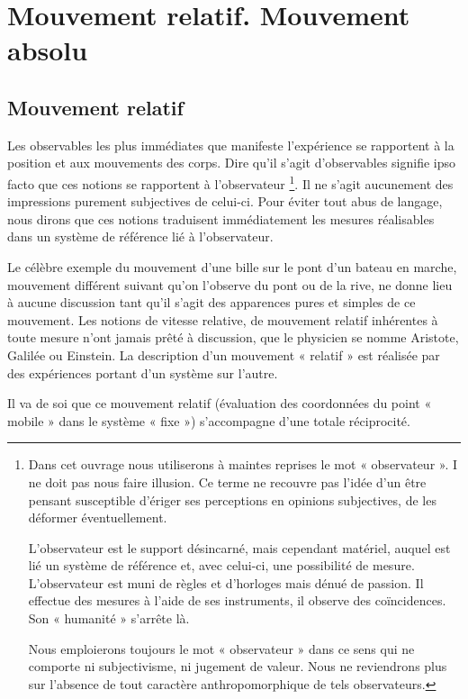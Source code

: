 \section{Mouvement relatif. Mouvement absolu}

\subsection{Mouvement relatif}
Les observables les plus immédiates que manifeste
l’expérience se rapportent à la position et aux mouvements des corps.
Dire qu’il s’agit d’observables signifie ipso facto que ces notions se
rapportent à l’observateur \footnote{Dans cet ouvrage nous utiliserons à maintes reprises le mot « observateur ».
I ne doit pas nous faire illusion. Ce terme ne recouvre pas l’idée d’un être pensant
susceptible d’ériger ses perceptions en opinions subjectives, de les déformer éventuellement.

L’observateur est le support désincarné, mais cependant matériel, auquel est lié
un système de référence et, avec celui-ci, une possibilité de mesure. L’observateur
est muni de règles et d’horloges mais dénué de passion. Il effectue des mesures à
l’aide de ses instruments, il observe des coïncidences. Son « humanité » s’arrête là.

Nous emploierons toujours le mot « observateur » dans ce sens qui ne comporte
ni subjectivisme, ni jugement de valeur. Nous ne reviendrons plus sur l’absence
de tout caractère anthropomorphique de tels observateurs.}. Il ne s’agit aucunement des impressions
purement subjectives de celui-ci. Pour éviter tout abus de langage, nous
dirons que ces notions traduisent immédiatement les mesures réalisables
dans un système de référence lié à l’observateur.

Le célèbre exemple du mouvement d’une bille sur le pont d’un
bateau en marche, mouvement différent suivant qu’on l’observe du pont
ou de la rive, ne donne lieu à aucune discussion tant qu'il s’agit des
apparences pures et simples de ce mouvement. Les notions de vitesse
relative, de mouvement relatif inhérentes à toute mesure n’ont jamais
prêté à discussion, que le physicien se nomme Aristote, Galilée ou Einstein.
La description d’un mouvement « relatif » est réalisée par des expériences
portant d’un système sur l’autre.

Il va de soi que ce mouvement relatif (évaluation des coordonnées du
point « mobile » dans le système « fixe ») s’accompagne d’une totale
réciprocité.


